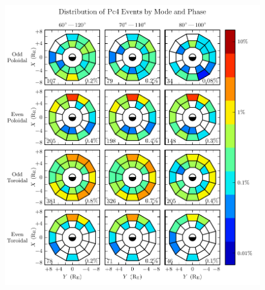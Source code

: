 \begin{figure}[!htb]
    \centering
    \includegraphics[width=\textwidth]{figures/mode_phase.pdf}
    \caption[Observation Rate of Pc4 Events by Mode and Phase]{
      \todo{$\cdots$}
    }
    \label{fig_mode_phase}
\end{figure}






